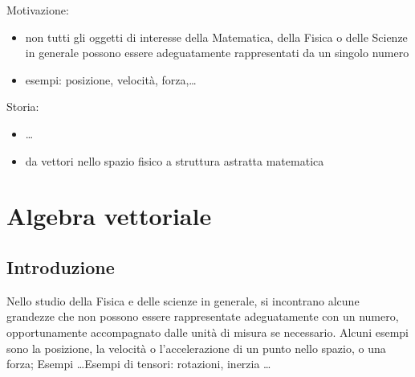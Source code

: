 Motivazione:
\begin{itemize}
  \item non tutti gli oggetti di interesse della Matematica, della Fisica o delle Scienze in generale possono essere adeguatamente rappresentati da un singolo numero
  \item esempi: posizione, velocità, forza,\dots
\end{itemize}

Storia:
\begin{itemize}
  \item \dots
  \item da vettori nello spazio fisico a struttura astratta matematica
\end{itemize}


\chapter{Algebra vettoriale}

\section{Introduzione}
Nello studio della Fisica e delle scienze in generale, si incontrano alcune grandezze che non possono essere rappresentate adeguatamente con un numero, opportunamente accompagnato dalle unità di misura se necessario. Alcuni esempi sono la posizione, la velocità o l'accelerazione di un punto nello spazio, o una forza; {\color{red} Esempi \dots Esempi di tensori: rotazioni, inerzia \dots}

